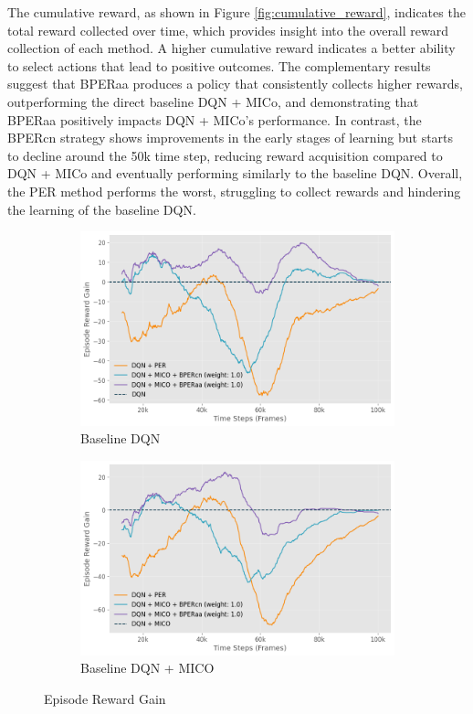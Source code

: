 The cumulative reward, as shown in Figure \ref{fig:cumulative_reward}, indicates the total reward collected over time, which provides insight into the overall reward collection of each method. A higher cumulative reward indicates a better ability to select actions that lead to positive outcomes. The complementary results suggest that BPERaa produces a policy that consistently collects higher rewards, outperforming the direct baseline DQN + MICo, and demonstrating that BPERaa positively impacts DQN + MICo's performance. In contrast, the BPERcn strategy shows improvements in the early stages of learning but starts to decline around the 50k time step, reducing reward acquisition compared to DQN + MICo and eventually performing similarly to the baseline DQN. Overall, the PER method performs the worst, struggling to collect rewards and hindering the learning of the baseline DQN.

\begin{figure}[!h]
    \centering
    \begin{subfigure}{0.45\textwidth}
    \includegraphics[width=\linewidth]{Results/grid_world/episode_reward_gain_baseline_dqn.png}
        \caption{Baseline DQN}
        \label{fig:episode_reward_gain_dqn}
    \end{subfigure}
    \hfill
    \begin{subfigure}{0.45\textwidth}
        \includegraphics[width=\linewidth]{Results/grid_world/episode_reward_gain_baseline_dqn_mico.png}
        \caption{Baseline DQN + MICO}
        \label{fig:episode_reward_gain_dqn_mico}
    \end{subfigure}
    \caption{Episode Reward Gain }
    \label{fig:episode_reward_gain_dqn_and_mico}
\end{figure}

